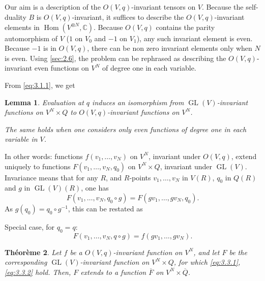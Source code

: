 \documentclass[11pt,a4paper]{article}
\theoremstyle{plain}
\newtheorem{theorem}{Th\'eor\`eme}
\newtheorem{lemma}[theorem]{Lemma}
\theoremstyle{definition}
\DeclareMathOperator{\Hom}{Hom}
\DeclareMathOperator{\GL}{GL}
\newcommand{\C}{\mathbb{C}}
\begin{document}
\subsection{}
Our aim is a description of the $O(V,q)$-invariant tensors on $V$. Because the self-duality $B$ is $O(V,q)$-invariant, it suffices to describe the $O(V,q)$-invariant elements in $\Hom(V^{\otimes N}, \C)$. Because $O(V,q)$ contains the parity automorphism of $V$ ($1$ on $V_0$ and $-1$ on $V_1$), any such invariant element is even. Because $-1$ is in $O(V,q)$, there can be non zero invariant elements only when $N$ is even. Using \ref{sec:2.6}, the problem can be rephrased as describing the $O(V,q)$-invariant even functions on $V^N$ of degree one in each variable.

From \eqref{eq:3.1.1}, we get

\begin{lemma}\label{lem:3.3}
Evaluation at $q$ induces an isomorphism from $\GL(V)$-invariant functions on $V^N \times Q$ to $O(V,q)$-invariant functions on $V^N$.

The same holds when one considers only even functions of degree one in each variable in $V$.
\end{lemma}

In other words: functions $f(v_1,\dots,v_N)$ on $V^N$, invariant under $O(V,q)$, extend uniquely to functions $F(v_1,\dots,v_N, q_0)$ on $V^N \times Q$, invariant under $\GL(V)$. Invariance means that for any $R$, and $R$-points $v_1,\dots,v_N$ in $V(R)$, $q_0$ in $Q(R)$ and $g$ in $\GL(V)(R)$, one has
\begin{equation}\label{eq:3.3.1}
F(v_1,\dots,v_N, q_0 \circ g) = F(gv_1,\dots,gv_N, q_0).
\end{equation}
As $g(q_0) = q_0 \circ g^{-1}$, this can be restated as

Special case, for $q_0 = q$:
\begin{equation}\label{eq:3.3.2}
F(v_1,\dots,v_N, q \circ g) = f(gv_1,\dots,gv_N).
\end{equation}

\begin{theorem}\label{thm:3.4}
Let $f$ be a $O(V,q)$-invariant function on $V^N$, and let $F$ be the corresponding $\GL(V)$-invariant function on $V^N \times Q$, for which \eqref{eq:3.3.1}, \eqref{eq:3.3.2} hold. Then, $F$ extends to a function $\overline{F}$ on $V^N \times \overline{Q}$.
\end{theorem}
\end{document}
